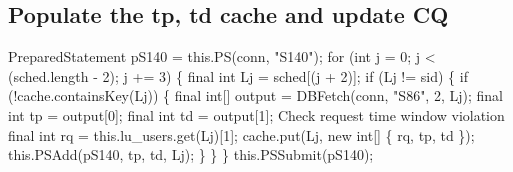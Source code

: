 \subsection{Populate the tp, td cache and update CQ}
\nwenddocs{}\endmoddef{}
PreparedStatement pS140 = this.PS(conn, "S140");
for (int j = 0; j < (sched.length - 2); j += 3) \{
  final int Lj = sched[(j + 2)];
  if (Lj != sid) \{
    if (!cache.containsKey(Lj)) \{
      final int[] output = DBFetch(conn, "S86", 2, Lj);
      final int tp = output[0];
      final int td = output[1];
      \LA{}Check request time window violation~{\nwtagstyle{}}\RA{}
      final int rq = this.lu_users.get(Lj)[1];
      cache.put(Lj, new int[] \{ rq, tp, td \});
      this.PSAdd(pS140, tp, td, Lj);
    \}
  \}
\}
this.PSSubmit(pS140);
\nwendcode{}\nwdocspar

